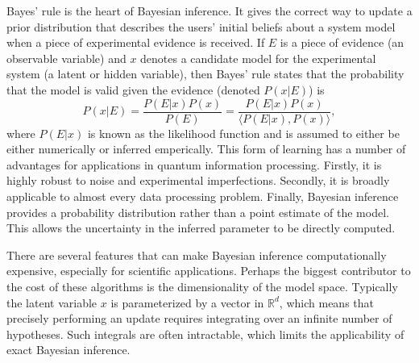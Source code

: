 \documentclass[aps,amsmath,onecolumn,amssymb,notitlepage]{revtex4-1}
\begin{document}
Bayes' rule is the heart of Bayesian inference.  It gives the correct way to update a prior distribution that describes the users' initial beliefs about a system model when a piece of experimental evidence is received.  If $E$ is a piece of evidence (an observable variable) and $x$ denotes a candidate model for the experimental system (a latent or hidden variable), then Bayes' rule states that the probability that the model is valid given the evidence (denoted $P(x|E)$) is 
\begin{equation}
P(x|E)= \frac{P(E|x) P(x)}{P(E)}= \frac{P(E|x) P(x)}{\langle P(E|x), P(x) \rangle},\label{eq:Bayes}
\end{equation}
where $P(E|x)$ is known as the likelihood function and is assumed to either be either numerically or inferred emperically.
This form of learning has a number of advantages for applications in quantum information processing.  Firstly, it is highly robust to noise and experimental imperfections.  Secondly, it is broadly applicable to almost every data processing problem.  Finally, Bayesian inference provides a probability distribution rather than a point estimate of the model. This allows the uncertainty in the inferred parameter to be directly computed.



There are several features that can make Bayesian inference computationally expensive, especially for scientific applications.  Perhaps the biggest contributor to the cost of these algorithms is the dimensionality of the model space.  Typically the latent variable $x$ is parameterized by a vector in $\mathbb{R}^d$, which means that precisely performing an update requires integrating over an infinite number of hypotheses.  Such integrals are often intractable, which limits the applicability of exact Bayesian inference.  %
\end{document}
